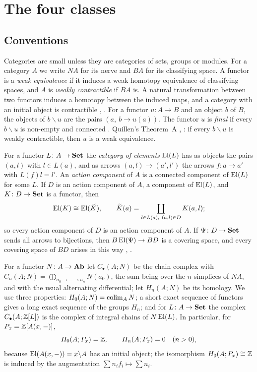 \section{The four classes}\label{sec:classes}

\subsection{Conventions}

Categories are small unless they are categories of sets, groups or modules.
For a category $A$ we write $NA$ for its nerve and $BA$ for its classifying
space. A functor is a \emph{weak equivalence} if it induces a weak homotopy
equivalence of classifying spaces, and $A$ is \emph{weakly contractible} if
$BA$ is. A natural transformation between two functors induces a homotopy
between the induced maps, and a category with an initial object is
contractible \cite{Quillen}, \cite[IV.3.2 and Example~IV.3.2.2]{Kbook}. For a
functor $u\colon A\to B$ and an object $b$ of $B$, the objects of
$b\backslash u$ are the pairs $(a,\ b\to u(a))$. The functor $u$ is
\emph{final} if every $b\backslash u$ is non-empty and connected
\cite[IX.3]{CWM}. Quillen's Theorem~A \cite{Quillen}, \cite[IV.3.7]{Kbook}: if every
$b\backslash u$ is weakly contractible, then $u$ is a weak equivalence.

For a functor $L\colon A\to\mathbf{Set}$ the \emph{category of elements} $\operatorname{El}(L)$ has
as objects the pairs $(a,l)$ with $l\in L(a)$, and as arrows
$(a,l)\to(a',l')$ the arrows $f\colon a\to a'$ with $L(f)l=l'$. An
\emph{action component} of $A$ is a connected component of $\operatorname{El}(L)$ for some
$L$. If $D$ is an action component of $A$, a component of $\operatorname{El}(L)$, and
$K\colon D\to\mathbf{Set}$ is a functor, then
\begin{equation}\label{eq:composite}
 \operatorname{El}(K)\cong\operatorname{El}(\widetilde K),\qquad
 \widetilde K(a)=\coprod_{l\in L(a),\ (a,l)\in D}K(a,l) ;
\end{equation}
so every action component of $D$ is an action component of $A$. If
$\Psi\colon D\to\mathbf{Set}$ sends all arrows to bijections, then
$B\operatorname{El}(\Psi)\to BD$ is a covering space, and every covering space of $BD$
arises in this way \cite{Quillen}, \cite[IV.3.5.1 and Exercise~IV.3.1]{Kbook}.

For a functor $N\colon A\to\mathbf{Ab}$ let $C_\bullet(A;N)$ be the chain complex with
$C_n(A;N)=\bigoplus_{a_0\to\dots\to a_n}N(a_0)$, the sum being over the
$n$-simplices of $NA$, and with the usual alternating differential; let
$H_n(A;N)$ be its homology. We use three properties: $H_0(A;N)=\operatorname{colim}_AN$; a
short exact sequence of functors gives a long exact sequence of the groups
$H_n$; and for $L\colon A\to\mathbf{Set}$ the complex $C_\bullet(A;\mathbb{Z}[L])$ is the
complex of integral chains of $N\operatorname{El}(L)$. In particular, for
$P_x=\mathbb{Z}[A(x,-)]$,
\begin{equation}\label{eq:rep}
 H_0(A;P_x)=\mathbb{Z},\qquad H_n(A;P_x)=0\quad(n>0),
\end{equation}
because $\operatorname{El}(A(x,-))=x\backslash A$ has an initial object; the isomorphism
$H_0(A;P_x)\cong\mathbb{Z}$ is induced by the augmentation
$\sum n_if_i\mapsto\sum n_i$.

